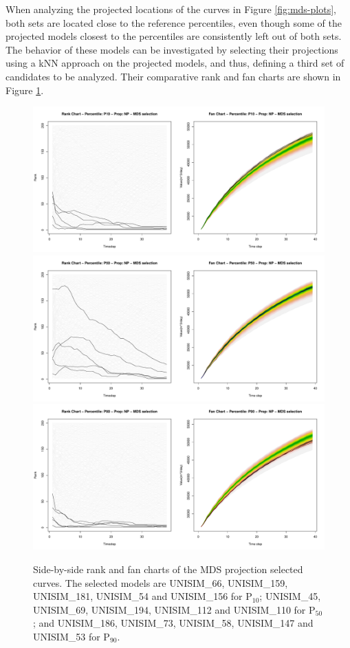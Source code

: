 \documentclass[final,5p,times,twocolumn]{elsarticle}
\begin{document}
When analyzing the projected locations of the curves in Figure \ref{fig:mds-plots}, both sets are located close to the reference percentiles, even though some of the projected models closest to the percentiles are consistently left out of both sets. The behavior of these models can be investigated by selecting their projections using a kNN approach on the projected models, and thus, defining a third set of candidates to be analyzed. Their comparative rank and fan charts are shown in Figure \ref{fig:rank-fan-mds}.

\begin{figure}[H]
  \centering
  \includegraphics[width=0.8\columnwidth]{rank-fan-mds-sel-p10.pdf}
  \includegraphics[width=0.8\columnwidth]{rank-fan-mds-sel-p50.pdf}
  \includegraphics[width=0.8\columnwidth]{rank-fan-mds-sel-p90.pdf}
  \caption{Side-by-side rank and fan charts of the MDS projection selected curves. The selected models are UNISIM\_66, UNISIM\_159, UNISIM\_181, UNISIM\_54 and UNISIM\_156 for P$_{10}$; UNISIM\_45, UNISIM\_69, UNISIM\_194, UNISIM\_112 and UNISIM\_110 for P$_{50}$; and UNISIM\_186, UNISIM\_73, UNISIM\_58, UNISIM\_147 and UNISIM\_53 for P$_{90}$.}
  \label{fig:rank-fan-mds}
\end{figure}
\end{document}
